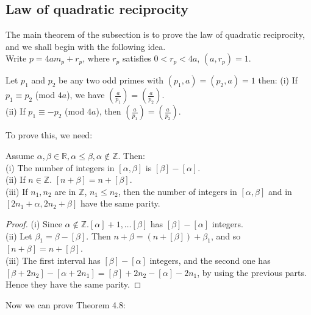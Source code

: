 \subsection{Law of quadratic reciprocity}
The main theorem of the subsection is to prove the law of quadratic reciprocity, and we shall begin with the following idea.\\
Write $p=4am_p+r_p$, where $r_p$ satisfies $0<r_p<4a$, $(a,r_p)=1$.
\begin{theorem} Let $p_1$ and $p_2$ be any two odd primes with $(p_1,a)=(p_2,a)=1$ then:
(i) If $p_1 \equiv p_2$ (mod $4a$), we have $(\frac{a}{p_1})=(\frac{a}{p_2})$.\\
(ii) If $p_1 \equiv -p_2$ (mod $4a$), then $(\frac{a}{p_1})=(\frac{a}{p_2})$.\
\end{theorem}
To prove this, we need:
\begin{lemma} Assume $\alpha,\beta \in \mathbb{R}, \alpha \le \beta, \alpha \not \in \mathbb{Z}$. Then:\\
(i) The number of integers in $[\alpha,\beta]$ is $[\beta]-[\alpha]$.\\
(ii) If $n \in \mathbb{Z}$. $[n+\beta]=n+[\beta]$.\\
(iii) If $n_1,n_2$ are in $\mathbb{Z}$, $n_1 \le n_2$, then the number of integers in $[\alpha,\beta]$ and in $[2n_1+\alpha,2n_2 + \beta]$ have the same parity.
\end{lemma}
\begin{proof}(i) Since $\alpha \not \in \mathbb{Z}. [\alpha]+1,\ldots [\beta]$ has $[\beta]-[\alpha]$ integers.\\
(ii) Let $\beta_1=\beta-[\beta]$. Then $n+\beta=(n+[\beta])+\beta_1$, and so $[n+\beta]=n+[\beta]$.\\
(iii) The first interval has $[\beta]-[\alpha]$ integers, and the second one has $[\beta+2n_2]-[\alpha+2n_1] = [\beta]+2n_2-[\alpha]-2n_1$, by using the previous parts. Hence they have the same parity.
\end{proof}
Now we can prove Theorem 4.8:
